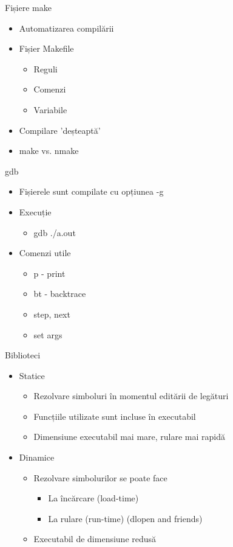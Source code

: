 \documentclass{so.cs.pub.ro}
\begin{document}
\begin{frame}{Fișiere make}
	\begin{itemize}
		\item Automatizarea compilării
		\item Fișier Makefile
		\begin{itemize}
			\item Reguli
			\item Comenzi
			\item Variabile
		\end{itemize}
		\item Compilare 'deșteaptă'
		\item make vs. nmake
	\end{itemize}
\end{frame}

\begin{frame}{gdb}
	\begin{itemize}
		\item Fișierele sunt compilate cu opțiunea -g
		\item Execuție
		\begin{itemize}
			\item gdb ./a.out
		\end{itemize}
		\item Comenzi utile
		\begin{itemize}
			\item p - print
			\item bt - backtrace
			\item step, next
			\item set args
		\end{itemize}
	\end{itemize}
\end{frame}

\begin{frame}{Biblioteci}
	\begin{itemize}
		\item Statice
		\begin{itemize}
			\item Rezolvare simboluri în momentul editării de legături
			\item Funcțiile utilizate sunt incluse în executabil
			\item Dimensiune executabil mai mare, rulare mai rapidă
		\end{itemize}
		\item Dinamice
		\begin{itemize}
			\item Rezolvare simbolurilor se poate face
			\begin{itemize}
					\item La încărcare (load-time)
					\item La rulare (run-time) (dlopen and friends)
			\end{itemize}
			\item Executabil de dimensiune redusă
		\end{itemize}
	\end{itemize}
\end{frame}
\end{document}
